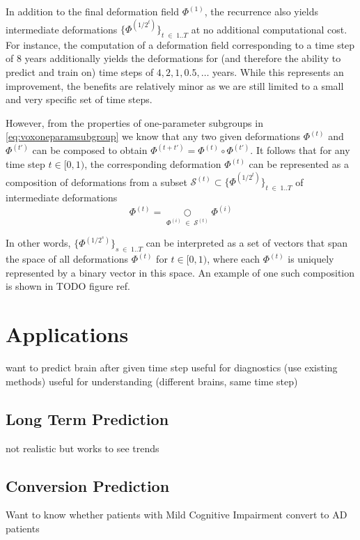 In addition to the final deformation field $\Phi^{(1)}$, the recurrence also yields intermediate deformations $\{ \Phi^{(1 / 2^{t})} \}_{t \; \in \; 1 .. T} $ at no additional computational cost. For instance, the computation of a deformation field corresponding to a time step of 8 years additionally yields the deformations for (and therefore the ability to predict and train on) time steps of ${ 4, 2, 1, 0.5, \ldots }$ years. While this represents an improvement, the benefits are relatively minor as we are still limited to a small and very specific set of time steps.

However, from the properties of one-parameter subgroups in \autoref{eq:voxoneparamsubgroup} we know that any two given deformations $\Phi^{(t)}$ and $\Phi^{(t')}$ can be composed to obtain ${ \Phi^{(t + t')} = \Phi^{(t)} \circ \Phi^{(t')} }$. It follows that for any time step $t \in [0, 1)$, the corresponding deformation $\Phi^{(t)}$ can be represented as a composition of deformations from a subset $\mathcal{S}^{(t)} \subset \{ \Phi^{(1 / 2^{t})} \}_{t \; \in \; 1 .. T} $ of intermediate deformations
\begin{equation}
	\Phi^{(t)} = \underset{\Phi^{(i)} \; \in \; \mathcal{S}^{(t)}}{\bigcirc} \Phi^{(i)}
\end{equation}

In other words, $\{ \Phi^{(1 / 2^{s})} \}_{s \; \in \; 1 .. T}$ can be interpreted as a set of vectors that span the space of all deformations $\Phi^{(t)}$ for $t \in [0, 1)$, where each $\Phi^{(t)}$ is uniquely represented by a binary vector in this space. An example of one such composition is shown in TODO figure ref.



\chapter{Applications}

want to predict brain after given time step
useful for diagnostics (use existing methods)
useful for understanding (different brains, same time step)

\section{Long Term Prediction}
not realistic but works to see trends

\section{Conversion Prediction}
Want to know whether patients with Mild Cognitive Impairment convert to AD patients

